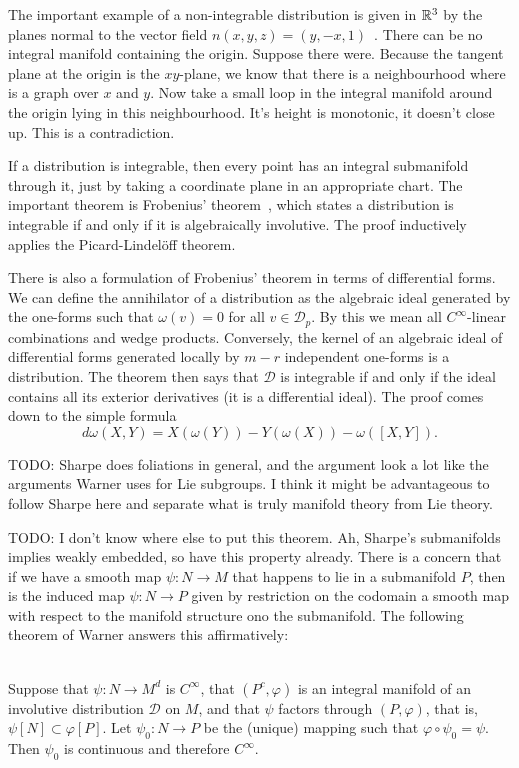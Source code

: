 The important example of a non-integrable distribution is given in $\mathbb{R}^3$ by the planes normal to the vector field $n(x,y,z)=(y,-x,1)$~\cite[Ex~3.1]{Sharpe1997}.
There can be no integral manifold containing the origin.
Suppose there were.
Because the tangent plane at the origin is the $xy$-plane, we know that there is a neighbourhood where is a graph over $x$ and $y$.
Now take a small loop in the integral manifold around the origin lying in this neighbourhood.
It's height is monotonic, it doesn't close up.
This is a contradiction.


If a distribution is integrable, then every point has an integral submanifold through it, just by taking a coordinate plane in an appropriate chart.
The important theorem is Frobenius' theorem~\cite[2.4.1]{Sharpe1997}, which states a distribution is integrable if and only if it is algebraically involutive.
The proof inductively applies the Picard-Lindelöff theorem.


There is also a formulation of Frobenius' theorem in terms of differential forms.
We can define the annihilator of a distribution as the algebraic ideal generated by the one-forms such that $\omega(v) = 0$ for all $v \in \mathcal{D}_p$.
By this we mean all $C^\infty$-linear combinations and wedge products.
Conversely, the kernel of an algebraic ideal of differential forms generated locally by $m-r$ independent one-forms is a distribution.
The theorem then says that $\mathcal{D}$ is integrable if and only if the ideal contains all its exterior derivatives (it is a differential ideal).
The proof comes down to the simple formula
\[
d\omega(X,Y) = X(\omega(Y)) - Y(\omega(X)) - \omega([X,Y]).
\]

TODO: Sharpe does foliations in general, and the argument look a lot like the arguments Warner uses for Lie subgroups.
I think it might be advantageous to follow Sharpe here and separate what is truly manifold theory from Lie theory.


TODO: I don't know where else to put this theorem. Ah, Sharpe's submanifolds implies weakly embedded, so have this property already.
There is a concern that if we have a smooth map $\psi: N \to M$ that happens to lie in a submanifold $P$, then is the induced map $\psi : N \to P$ given by restriction on the codomain a smooth map with respect to the manifold structure ono the submanifold.
The following theorem of Warner answers this affirmatively:
\begin{theorem}\label{theorem:cinfty}
\textup{\cite[1.62]{Warner1983}}\\
Suppose that $\psi \colon N \to M^d$ is $C^{\infty}$, that $(P^c,\varphi)$ is an integral manifold of an involutive distribution $\mathcal{D}$ on $M$, and that $\psi$ factors through $(P,\varphi)$, that is, $\psi[N] \subset \varphi[P]$. Let $\psi_0 : N \to P$ be the (unique) mapping such that $\varphi\circ \psi_0 = \psi$. Then $\psi_0$ is continuous and therefore $C^{\infty}$.
\end{theorem}

